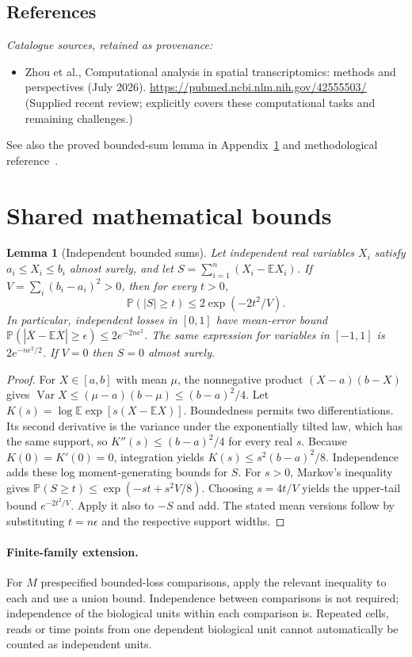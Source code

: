 \documentclass[11pt]{article}
\newcommand{\E}{\mathbb E}
\newcommand{\Prob}{\mathbb P}
\DeclareMathOperator{\Var}{Var}
\providecommand{\E}{\mathbb E}
\providecommand{\Prob}{\mathbb P}
\providecommand{\Var}{\operatorname{Var}}
\newtheorem{sharedlemma}{Lemma}[section]
\begin{document}
\subsection{References}
\noindent\emph{Catalogue sources, retained as provenance:}
\begin{itemize}
\item Zhou et al., Computational analysis in spatial transcriptomics: methods and perspectives (July 2026). \url{https://pubmed.ncbi.nlm.nih.gov/42555503/} (Supplied recent review; explicitly covers these computational tasks and remaining challenges.)
\end{itemize}
\noindent See also the proved bounded-sum lemma in Appendix~\ref{app:bounds} and methodological reference~\cite{hoeffding}.
\clearpage


\appendix
\section{Shared mathematical bounds}\label{app:bounds}
\begin{sharedlemma}[Independent bounded sums]\label{lem:bounded}
Let independent real variables $X_i$ satisfy $a_i\leq X_i\leq b_i$ almost surely,
and let $S=\sum_{i=1}^n(X_i-\E X_i)$. If
$V=\sum_i(b_i-a_i)^2>0$, then for every $t>0$,
\[
 \Prob(|S|\geq t)\leq 2\exp(-2t^2/V).
\]
In particular, independent losses in $[0,1]$ have mean-error bound
$\Prob(|\overline X-\E\overline X|\geq\epsilon)
\leq2e^{-2n\epsilon^2}$. The same expression for variables in $[-1,1]$
is $2e^{-n\epsilon^2/2}$. If $V=0$ then $S=0$ almost surely.
\end{sharedlemma}
\begin{proof}
For $X\in[a,b]$ with mean $\mu$, the nonnegative product
$(X-a)(b-X)$ gives
$\Var X\leq(\mu-a)(b-\mu)\leq(b-a)^2/4$.
Let $K(s)=\log\E\exp[s(X-\E X)]$.
Boundedness permits two differentiations. Its second derivative is the variance
under the exponentially tilted law, which has the same support, so
$K''(s)\leq(b-a)^2/4$ for every real $s$.
Because $K(0)=K'(0)=0$, integration yields
$K(s)\leq s^2(b-a)^2/8$.
Independence adds these log moment-generating bounds for $S$.
For $s>0$, Markov's inequality gives
$\Prob(S\geq t)\leq\exp(-st+s^2V/8)$.
Choosing $s=4t/V$ yields the upper-tail bound $e^{-2t^2/V}$.
Apply it also to $-S$ and add. The stated mean versions follow by substituting
$t=n\epsilon$ and the respective support widths.
\end{proof}

\paragraph{Finite-family extension.}
For $M$ prespecified bounded-loss comparisons, apply the relevant inequality to
each and use a union bound. Independence between comparisons is not required;
independence of the biological units within each comparison is. Repeated cells,
reads or time points from one dependent biological unit cannot automatically be
counted as independent units.
\end{document}
